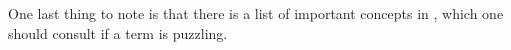 \documentclass[
 11pt,
 twoside,
 a4paper,
 final                                 %
]{article}
\begin{document}
   One last thing to note is that there is a list of important concepts in
   , which one should consult if a term is puzzling.

\rhead{\rightmark}         %





















































% 

\end{document}
